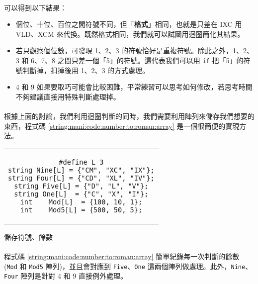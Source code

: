 \documentclass[12pt,a4paper,oneside]{article}
\begin{document}
\begin{CJK}{UTF8}{bkai}
\paragraph{}可以得到以下結果：
\begin{itemize}
\item 個位、十位、百位之間符號不同，但「{\color{blue}\textbf{格式}}」相同，也就是只差在 IXC 用 VLD、XCM 來代換。既然格式相同，我們就可以試圖用迴圈簡化其結果。
\item 若只觀察個位數，可發現 1、2、3 的符號恰好是重複符號。除此之外，1、2、3 和 6、7、8 之間只差一個「5」的符號。這代表我們可以用 \lstinline!if! 把「5」的符號判斷掉，扣掉後用 1、2、3 的方式處理。
\item 4 和 9 如果要取巧可能會比較困難，平常練習可以思考如何修改，若思考時間不夠建議直接用特殊判斷處理掉。
\end{itemize}

\paragraph{}根據上面的討論，我們利用迴圈判斷的同時，我們需要利用陣列來儲存我們想要的東西，程式碼 \ref{string:mani:code:number:to:roman:array} 是一個很簡便的實現方法。

\begin{code}[h!]
  \centering
  \begin{tabular}{c}
  \begin{lstlisting}
#define L 3
string Nine[L] = {"CM", "XC", "IX"};
string Four[L] = {"CD", "XL", "IV"};
string Five[L] = {"D", "L", "V"};
string One[L]  = {"C", "X", "I"};
int    Mod[L]  = {100, 10, 1};
int    Mod5[L] = {500, 50, 5};
  \end{lstlisting}
  \end{tabular}
  \caption{儲存符號、餘數}
  \label{string:mani:code:number:to:roman:array}
\end{code}

\paragraph{}程式碼 \ref{string:mani:code:number:to:roman:array} 簡單紀錄每一次判斷的餘數 (\lstinline!Mod! 和 \lstinline!Mod5! 陣列)，並且會對應到 \lstinline!Five!、\lstinline!One! 這兩個陣列做處理。此外，\lstinline!Nine!、\lstinline!Four! 陣列是針對 4 和 9 直接例外處理。


\end{CJK}
\end{document}
